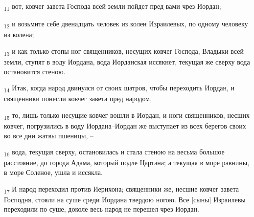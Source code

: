 \begin{tcolorbox}
\textsubscript{11} вот, ковчег завета Господа всей земли пойдет пред вами чрез Иордан;
\end{tcolorbox}
\begin{tcolorbox}
\textsubscript{12} и возьмите себе двенадцать человек из колен Израилевых, по одному человеку из колена;
\end{tcolorbox}
\begin{tcolorbox}
\textsubscript{13} и как только стопы ног священников, несущих ковчег Господа, Владыки всей земли, ступят в воду Иордана, вода Иорданская иссякнет, текущая же сверху вода остановится стеною.
\end{tcolorbox}
\begin{tcolorbox}
\textsubscript{14} Итак, когда народ двинулся от своих шатров, чтобы переходить Иордан, и священники понесли ковчег завета пред народом,
\end{tcolorbox}
\begin{tcolorbox}
\textsubscript{15} то, лишь только несущие ковчег вошли в Иордан, и ноги священников, несших ковчег, погрузились в воду Иордана--Иордан же выступает из всех берегов своих во все дни жатвы пшеницы, --
\end{tcolorbox}
\begin{tcolorbox}
\textsubscript{16} вода, текущая сверху, остановилась и стала стеною на весьма большое расстояние, до города Адама, который подле Цартана; а текущая в море равнины, в море Соленое, ушла и иссякла.
\end{tcolorbox}
\begin{tcolorbox}
\textsubscript{17} И народ переходил против Иерихона; священники же, несшие ковчег завета Господня, стояли на суше среди Иордана твердою ногою. Все [сыны] Израилевы переходили по суше, доколе весь народ не перешел чрез Иордан.
\end{tcolorbox}
